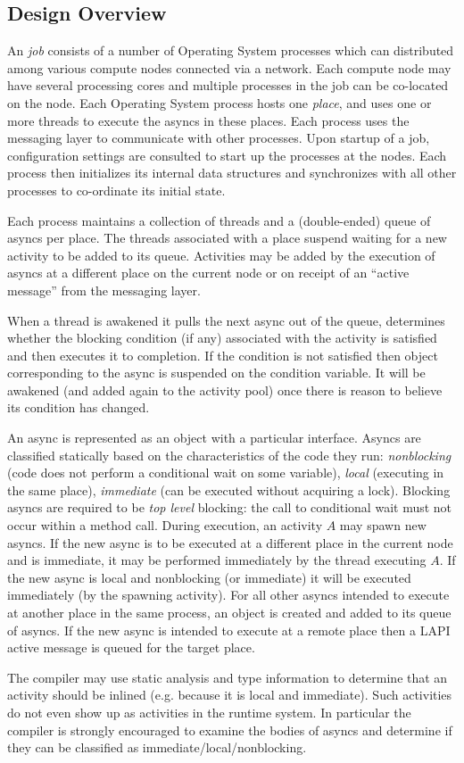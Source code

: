 \subsection{Design Overview}

An \Xten{} {\em job} consists of a number of \Xten{} Operating System
processes which can distributed among various compute nodes connected
via a network. Each compute node may have several processing cores and
multiple processes in the job can be co-located on the node. Each
Operating System process hosts one \Xten{} {\em place}, and uses one or
more threads to execute the asyncs in these places.
Each process uses the messaging layer to communicate with other
processes. Upon startup of a job, configuration settings are consulted 
to start up the processes at the nodes. Each process then initializes
its internal data structures and synchronizes with all other processes
to co-ordinate its initial state.

Each process maintains a collection of threads and a (double-ended)
queue of asyncs per place. The threads associated with a place suspend
waiting for a new activity to be added to its queue. Activities may be
added by the execution of asyncs at a different place on the current
node or on receipt of an ``active message'' from the messaging layer.

When a thread is awakened it pulls the next async out of the queue,
determines whether the blocking condition (if any) associated with the
activity is satisfied and then executes it to completion. If the
condition is not satisfied then object corresponding to the async is
suspended on the condition variable. It will be awakened (and added
again to the activity pool) once there is reason to believe its
condition has changed.

An async is represented as an object with a particular interface.
Asyncs are classified statically based on the characteristics of the
code they run: {\em nonblocking} (code does not perform a conditional
wait on some variable), {\em local} (executing in the same place), {\em
immediate} (can be executed without acquiring a lock). Blocking asyncs
are required to be {\em top level} blocking: the call to conditional
wait must not occur within a method call. During execution, an activity
$A$ may spawn new asyncs. If the new async is to be executed at a
different place in the current node and is immediate, it may be
performed immediately by the thread executing $A$.  If the new async is
local and nonblocking (or immediate) it will be executed immediately (by
the spawning activity).  For all other asyncs intended to execute at
another place in the same process, an object is created and added to its
queue of asyncs. If the new async is intended to execute at a remote
place then a LAPI active message is queued for the target place. 

The compiler may use static analysis and type information to
determine that an activity should be inlined (e.g.{} because it is
local and immediate). Such activities do not even show up as
activities in the runtime system. In particular the compiler is
strongly encouraged to examine the bodies of asyncs and determine if
they can be classified as immediate/local/nonblocking.

